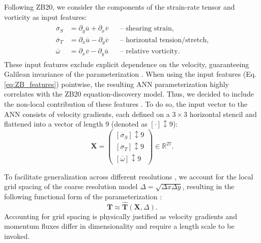 \documentclass[draft]{agujournal2019}
\begin{document}
Following ZB20, we consider the components of the strain-rate tensor and vorticity as input features:
\begin{gather}
    \begin{aligned}
        \overline{\sigma}_S & = \partial_y \overline{u} + \partial_x \overline{v} && \text{-- shearing strain,} \\
        \overline{\sigma}_T & = \partial_x \overline{u} - \partial_y \overline{v} && \text{-- horizontal tension/stretch,} \\
        \overline{\omega} & = \partial_x \overline{v} - \partial_y \overline{u} && \text{-- relative vorticity.}
    \end{aligned} \label{eq:ZB_features}
\end{gather}
These input features exclude explicit dependence on the velocity, guaranteeing Galilean invariance of the parameterization \cite{srinivasan2024turbulence,pope1975more, lund1993parameterization, ling2016reynolds}. When using the input features (Eq. \eqref{eq:ZB_features}) pointwise, the resulting ANN parameterization highly correlates with the ZB20 equation-discovery model. Thus, we decided to include the non-local contribution of these features \cite{srinivasan2024turbulence, maulik2017neural, maulik2019subgrid, pawar2020priori, wang2021artificial, wang2022constant, gultekin2024analysis}. To do so, the input vector to the ANN consists of velocity gradients, each defined on a $3 \times 3$ horizontal stencil and flattened into a vector of length 9 (denoted as $\left[ \cdot \right]{\updownarrow \scriptstyle 9}$):
\begin{equation}
    \mathbf{X} =
    \begin{pmatrix}
        \left[ \overline{\sigma}_S \right]{\updownarrow \scriptstyle 9}  \\
        \left[ \overline{\sigma}_T \right]{\updownarrow \scriptstyle 9} \\
        \left[ \overline{\omega} \right]{\updownarrow \scriptstyle 9}
    \end{pmatrix} \in \mathbb{R}^{27}. \label{eq:stack_features}
\end{equation}

To facilitate generalization across different resolutions \cite<scale-aware or grid-aware parameterization,>{bachman2017scale}, we account for the local grid spacing of the coarse resolution model $\Delta = \sqrt{\Delta x \Delta y}$, resulting in the following functional form of the parameterization \cite{lund1993parameterization, li2025transformer}:
\begin{equation}
    \mathbf{T} \approx \widehat{\mathbf{T}}(\mathbf{X}, \Delta). \label{eq:model_2}
\end{equation}
Accounting for grid spacing is physically justified as velocity gradients and momentum fluxes differ in dimensionality and require a length scale to be invoked.
\end{document}
